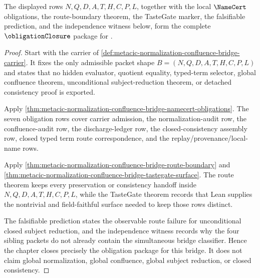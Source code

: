 \begin{theorem}
\label{thm:metacic-normalization-confluence-bridge-obligation-closure-package}
The displayed rows $N,Q,D,A,T,H,C,P,L$, together with the local $\NameCert$ obligations, the route-boundary theorem, the TasteGate marker, the falsifiable prediction, and the independence witness below, form the complete $\obligationClosure$ package for \MetacicNormalizationConfluenceBridgeUp{}.
\end{theorem}
\begin{proof}
Start with the carrier of \autoref{def:metacic-normalization-confluence-bridge-carrier}. It fixes the only admissible packet shape $B=(N,Q,D,A,T,H,C,P,L)$ and states that no hidden evaluator, quotient equality, typed-term selector, global confluence theorem, unconditional subject-reduction theorem, or detached consistency proof is exported.

Apply \autoref{thm:metacic-normalization-confluence-bridge-namecert-obligations}. The seven obligation rows cover carrier admission, the normalization-audit row, the confluence-audit row, the discharge-ledger row, the closed-consistency assembly row, closed typed term route correspondence, and the replay/provenance/local-name rows.

Apply \autoref{thm:metacic-normalization-confluence-bridge-route-boundary} and \autoref{thm:metacic-normalization-confluence-bridge-tastegate-surface}. The route theorem keeps every preservation or consistency handoff inside $N,Q,D,A,T,H,C,P,L$, while the TasteGate theorem records that Lean supplies the nontrivial and field-faithful surface needed to keep those rows distinct.

The falsifiable prediction states the observable route failure for unconditional closed subject reduction, and the independence witness records why the four sibling packets do not already contain the simultaneous bridge classifier. Hence the chapter closes precisely the obligation package for this bridge. It does not claim global normalization, global confluence, global subject reduction, or closed consistency.
\end{proof}

